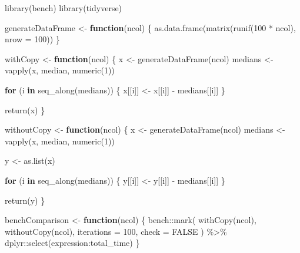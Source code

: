 \documentclass[
]{book}
\newenvironment{Shaded}{\begin{snugshade}}{\end{snugshade}}
\newcommand{\AttributeTok}[1]{\textcolor[rgb]{0.77,0.63,0.00}{#1}}
\newcommand{\ConstantTok}[1]{\textcolor[rgb]{0.00,0.00,0.00}{#1}}
\newcommand{\ControlFlowTok}[1]{\textcolor[rgb]{0.13,0.29,0.53}{\textbf{#1}}}
\newcommand{\DecValTok}[1]{\textcolor[rgb]{0.00,0.00,0.81}{#1}}
\newcommand{\FunctionTok}[1]{\textcolor[rgb]{0.00,0.00,0.00}{#1}}
\newcommand{\NormalTok}[1]{#1}
\newcommand{\OtherTok}[1]{\textcolor[rgb]{0.56,0.35,0.01}{#1}}
\newcommand{\SpecialCharTok}[1]{\textcolor[rgb]{0.00,0.00,0.00}{#1}}
\begin{document}
\begin{Shaded}
\begin{Highlighting}[]
\FunctionTok{library}\NormalTok{(bench)}
\FunctionTok{library}\NormalTok{(tidyverse)}

\NormalTok{generateDataFrame }\OtherTok{\textless{}{-}} \ControlFlowTok{function}\NormalTok{(ncol) \{}
  \FunctionTok{as.data.frame}\NormalTok{(}\FunctionTok{matrix}\NormalTok{(}\FunctionTok{runif}\NormalTok{(}\DecValTok{100} \SpecialCharTok{*}\NormalTok{ ncol), }\AttributeTok{nrow =} \DecValTok{100}\NormalTok{))}
\NormalTok{\}}

\NormalTok{withCopy }\OtherTok{\textless{}{-}} \ControlFlowTok{function}\NormalTok{(ncol) \{}
\NormalTok{  x }\OtherTok{\textless{}{-}} \FunctionTok{generateDataFrame}\NormalTok{(ncol)}
\NormalTok{  medians }\OtherTok{\textless{}{-}} \FunctionTok{vapply}\NormalTok{(x, median, }\FunctionTok{numeric}\NormalTok{(}\DecValTok{1}\NormalTok{))}

  \ControlFlowTok{for}\NormalTok{ (i }\ControlFlowTok{in} \FunctionTok{seq\_along}\NormalTok{(medians)) \{}
\NormalTok{    x[[i]] }\OtherTok{\textless{}{-}}\NormalTok{ x[[i]] }\SpecialCharTok{{-}}\NormalTok{ medians[[i]]}
\NormalTok{  \}}

  \FunctionTok{return}\NormalTok{(x)}
\NormalTok{\}}

\NormalTok{withoutCopy }\OtherTok{\textless{}{-}} \ControlFlowTok{function}\NormalTok{(ncol) \{}
\NormalTok{  x }\OtherTok{\textless{}{-}} \FunctionTok{generateDataFrame}\NormalTok{(ncol)}
\NormalTok{  medians }\OtherTok{\textless{}{-}} \FunctionTok{vapply}\NormalTok{(x, median, }\FunctionTok{numeric}\NormalTok{(}\DecValTok{1}\NormalTok{))}

\NormalTok{  y }\OtherTok{\textless{}{-}} \FunctionTok{as.list}\NormalTok{(x)}

  \ControlFlowTok{for}\NormalTok{ (i }\ControlFlowTok{in} \FunctionTok{seq\_along}\NormalTok{(medians)) \{}
\NormalTok{    y[[i]] }\OtherTok{\textless{}{-}}\NormalTok{ y[[i]] }\SpecialCharTok{{-}}\NormalTok{ medians[[i]]}
\NormalTok{  \}}

  \FunctionTok{return}\NormalTok{(y)}
\NormalTok{\}}

\NormalTok{benchComparison }\OtherTok{\textless{}{-}} \ControlFlowTok{function}\NormalTok{(ncol) \{}
\NormalTok{  bench}\SpecialCharTok{::}\FunctionTok{mark}\NormalTok{(}
    \FunctionTok{withCopy}\NormalTok{(ncol),}
    \FunctionTok{withoutCopy}\NormalTok{(ncol),}
    \AttributeTok{iterations =} \DecValTok{100}\NormalTok{,}
    \AttributeTok{check =} \ConstantTok{FALSE}
\NormalTok{  ) }\SpecialCharTok{\%\textgreater{}\%}
\NormalTok{    dplyr}\SpecialCharTok{::}\FunctionTok{select}\NormalTok{(expression}\SpecialCharTok{:}\NormalTok{total\_time)}
\NormalTok{\}}


\end{Highlighting}
\end{Shaded}
\end{document}
